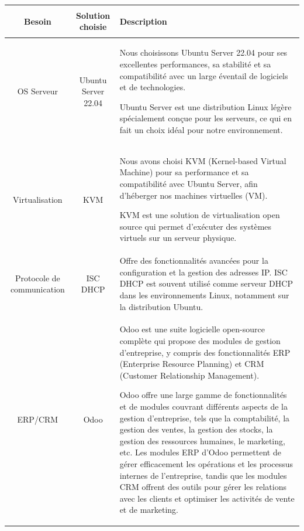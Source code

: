 \begin{table}[H]
\begin{center}
\begin{tabular}{|c{3cm}|c{3cm}|l{10cm}|}
\hline
\textbf{Besoin}         & \textbf{Solution choisie}   & \begin{center} \textbf{Description} \end{center} \\
\hline
OS Serveur & Ubuntu Server 22.04 &Nous choisissons Ubuntu Server 22.04 pour ses excellentes performances, sa stabilité et sa compatibilité avec un large éventail de logiciels et de technologies. 

Ubuntu Server est une distribution Linux légère spécialement conçue pour les serveurs, ce qui en fait un choix idéal pour notre environnement.
 \\
\hline
Virtualisation & KVM & Nous avons choisi KVM (Kernel-based Virtual Machine) pour sa performance et sa compatibilité avec Ubuntu Server, afin d’héberger nos machines virtuelles (VM). 

KVM est une solution de virtualisation open source qui permet d’exécuter des systèmes virtuels sur un serveur physique.
 \\
\hline
Protocole de communication & ISC DHCP & Offre des fonctionnalités avancées pour la configuration et la gestion des adresses IP. ISC DHCP est souvent utilisé comme serveur DHCP dans les environnements Linux, notamment sur la distribution Ubuntu. \\
\hline
ERP/CRM & Odoo & Odoo est une suite logicielle open-source complète qui propose des modules de gestion d'entreprise, y compris des fonctionnalités ERP (Enterprise Resource Planning) et CRM (Customer Relationship Management). 

Odoo offre une large gamme de fonctionnalités et de modules couvrant différents aspects de la gestion d'entreprise, tels que la comptabilité, la gestion des ventes, la gestion des stocks, la gestion des ressources humaines, le marketing, etc. Les modules ERP d'Odoo permettent de gérer efficacement les opérations et les processus internes de l'entreprise, tandis que les modules CRM offrent des outils pour gérer les relations avec les clients et optimiser les activités de vente et de marketing.


\end{tabular}
\end{center}
\end{table}
